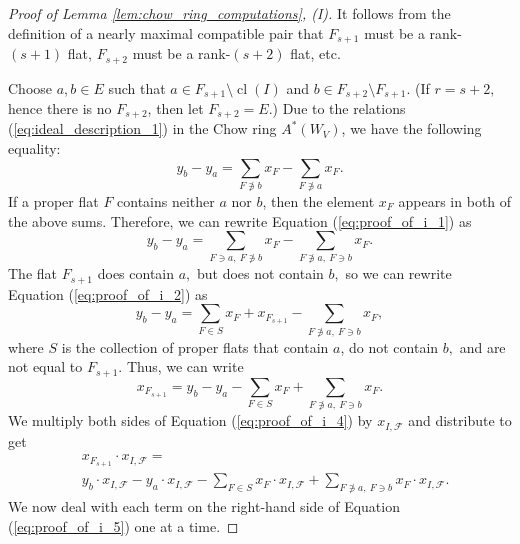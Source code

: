 \documentclass[10pt,a4paper]{amsart}
\newcommand{\cl}{\operatorname{cl}}
\begin{document}
\begin{proof}[Proof of Lemma \ref{lem:chow_ring_computations}, (I)]
It follows from the definition of a nearly maximal compatible pair that $F_{s+1}$ must be a rank-$(s+1)$ flat, $F_{s+2}$ must be a rank-$(s+2)$ flat, etc. 

Choose $a,b \in E$ such that $a \in F_{s+1} \setminus \cl(I)$ and $b \in F_{s+2} \setminus F_{s+1}.$ (If $r= s+2,$ hence there is no $F_{s+2}$, then let $F_{s+2} = E.$) Due to the relations (\ref{eq:ideal_description_1}) in the Chow ring $A^*(W_V)$, we have the following equality:
\begin{equation}
\label{eq:proof_of_i_1}
y_b - y_a = \sum_{F \not\ni b}x_F - \sum_{F \not\ni a}x_F.
\end{equation}
If a proper flat $F$ contains neither $a$ nor $b$, then the element $x_F$ appears in both of the above sums. Therefore, we can rewrite Equation (\ref{eq:proof_of_i_1}) as
\begin{equation}
\label{eq:proof_of_i_2}
y_b - y_a = \sum_{F \ni a,\: F \not\ni b}x_F - \sum_{F \not\ni a,\: F \ni b}x_F.
\end{equation}
The flat $F_{s+1}$ does contain $a,$ but does not contain $b,$ so we can rewrite Equation (\ref{eq:proof_of_i_2}) as
\begin{equation*}
\label{eq:proof_of_i_3}
y_b - y_a  = \sum_{F \in S}x_F  + x_{F_{s+1}}- \sum_{F \not\ni a,\: F \ni b}x_F,
\end{equation*}
where $S$ is the collection of proper flats that contain $a$, do not contain $b,$ and are not equal to $F_{s+1}$.
Thus, we can write
\begin{equation}
\label{eq:proof_of_i_4}
x_{F_{s+1}} = y_b - y_a  - \sum_{F \in S}x_F  + \sum_{F \not\ni a,\: F \ni b}x_F.
\end{equation}
We multiply both sides of Equation (\ref{eq:proof_of_i_4}) by $x_{I, \mathscr{F}}$ and distribute to get
\begin{equation}
\label{eq:proof_of_i_5}
\begin{split}
& x_{F_{s+1}} \cdot x_{I , \mathscr{F}} = \\ & y_b \cdot x_{I , \mathscr{F}} - y_a \cdot x_{I , \mathscr{F}}  - \sum_{F \in S}x_F \cdot x_{I , \mathscr{F}}  + \sum_{F \not\ni a,\: F \ni b}x_F \cdot x_{I , \mathscr{F}}.
\end{split}
\end{equation}
We now deal with each term on the right-hand side of Equation (\ref{eq:proof_of_i_5}) one at a time. 


\end{proof}
\end{document}

